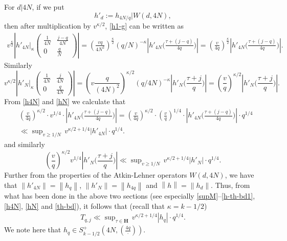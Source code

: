 \documentclass[11pt]{amsart}
\numberwithin{equation}{section}
\theoremstyle{plain}
\theoremstyle{definition}
\newcommand{\h}{\mf H}
\newcommand{\mf}{\mathbf}
\newcommand*{\norm}[1]{\left\lVert#1\right\rVert}
\begin{document}
For $d|4N$, if we put 
\[ h'_d:=h_{4N/q} |W(d,4N),\] 
then after multiplication by $v^{\kappa/2}$, \eqref{h1-g} can be written as
\begin{align} \label{h4N}
  v^{\frac{\kappa}{2}} \left| h'_{4N} |_\kappa \begin{pmatrix}   \frac{1}{4N} & \frac{j-q}{4N} \\ 0 & \frac{q}{N} \end{pmatrix} \right|= ( \frac{vq}{4N^2})^{\frac{\kappa}{2}} (q/N)^{-\kappa} \left|h'_{4N} \big (\frac{\tau + (j-q)}{4q} \big )\right| = (\frac{v}{4q})^{\frac{\kappa}{2}} \left| h'_{4N} \big (\frac{\tau + (j-q)}{4q} \big )\right|  .
\end{align}
Similarly
\begin{equation}\label{hN}
    v^{\kappa/2} \left| h'_{N} |_\kappa \begin{pmatrix}   \frac{1}{4N} & \frac{j}{4N} \\ 0 & \frac{q}{4N} \end{pmatrix} \right|= (v \frac{q}{(4N)^2})^{\kappa/2} (q/4N)^{-\kappa} |h'_N \big (\frac{\tau + j}{q} \big )| = (\frac{v}{q})^{\kappa/2} | h'_N \big (\frac{\tau + j}{q} \big )|  .
\end{equation}
From \eqref{h4N} and \eqref{hN} we calculate that
\begin{align}
   & (\frac{v}{4q})^{\kappa/2 }  \cdot v^{1/4} \cdot \left|  h'_{4N} \big (\frac{\tau + (j-q)}{4q} \big ) \right|  = (\frac{v}{4q})^{\kappa/2 }  \cdot (\frac{v}{q})^{1/4} \cdot \left| h'_{4N} \big (\frac{\tau + (j-q)}{4q} \big ) \right| \cdot q^{1/4} \label{genie} \\
    &  \ll \sup \nolimits_{ v \ge 1/N} \, v^{\kappa/2+1/4} \left| h'_{4N} \right|  \cdot q^{1/4}. \nonumber
\end{align}
and similarly
\begin{equation}
    (\frac{v}{q})^{\kappa/2} v^{1/4}| h'_N \big (\frac{\tau + j}{q} \big )|\ll \sup\nolimits_{v \ge 1/N} \, v^{\kappa/2+1/4} |h'_N|\cdot q^{1/4}. \label{nf1}
\end{equation}
Further from the properties of the Atkin-Lehner operators $W(d,4N)$, we have that $\norm{h'_{4N}}=\norm{h_q}$, $\norm{h'_{N}}=\norm{h_{4q}}$ and $\norm{h}= \norm{h_d}$. Thus, from what has been done in the above two sections (see especially \eqref{supM}--\eqref{h-th-bd1}, \eqref{h4N}, \eqref{hN} and \eqref{th-bd}), it follows that (recall that $\kappa = k - 1/2$)
\begin{align} \label{Tqj}
  T_{q,j}  \ll \sup\nolimits_{ \tau \in \h} \, v^{\kappa/2+1/4} \left| h_{q} \right|  \cdot q^{1/4}. 
\end{align}
We note here that $h_q\in S_{k-1/2}^+\left(4N, \left(\frac{4q}{\cdot}\right)\right)$. 
\end{document}
